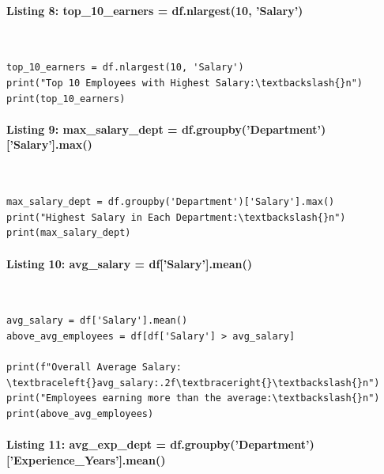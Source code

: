 \documentclass[12pt,a4paper,oneside]{report}
\begin{document}
\paragraph{Listing 8: top\_10\_earners = df.nlargest(10, 'Salary')}\mbox{}\\[-1ex]
\begin{Verbatim}[commandchars=\\\{\},breaklines=true,breakanywhere=true,fontsize=\scriptsize,frame=leftline,framesep=2mm,rulecolor=\color{gray}]
top_10_earners = df.nlargest(10, 'Salary')
print("Top 10 Employees with Highest Salary:\textbackslash{}n")
print(top_10_earners)
\end{Verbatim}
\paragraph{Listing 9: max\_salary\_dept = df.groupby('Department')['Salary'].max()}\mbox{}\\[-1ex]
\begin{Verbatim}[commandchars=\\\{\},breaklines=true,breakanywhere=true,fontsize=\scriptsize,frame=leftline,framesep=2mm,rulecolor=\color{gray}]
max_salary_dept = df.groupby('Department')['Salary'].max()
print("Highest Salary in Each Department:\textbackslash{}n")
print(max_salary_dept)
\end{Verbatim}
\paragraph{Listing 10: avg\_salary = df['Salary'].mean()}\mbox{}\\[-1ex]
\begin{Verbatim}[commandchars=\\\{\},breaklines=true,breakanywhere=true,fontsize=\scriptsize,frame=leftline,framesep=2mm,rulecolor=\color{gray}]
avg_salary = df['Salary'].mean()
above_avg_employees = df[df['Salary'] > avg_salary]

print(f"Overall Average Salary: \textbraceleft{}avg_salary:.2f\textbraceright{}\textbackslash{}n")
print("Employees earning more than the average:\textbackslash{}n")
print(above_avg_employees)
\end{Verbatim}
\paragraph{Listing 11: avg\_exp\_dept = df.groupby('Department')['Experience\_Years'].mean()}\mbox{}\\[-1ex]
\end{document}
